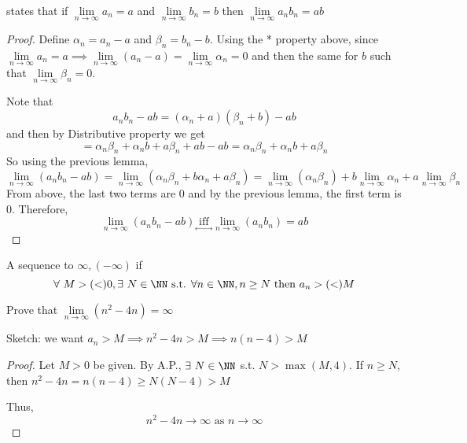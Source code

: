 \documentclass[12pt]{scrartcl}
\begin{document}
\begin{theorem}
   states that if $\underset{n\to\infty}{\lim}a_n = a$ and $\underset{n\to\infty}{\lim}b_n = b$ then 
  $\underset{n\to\infty}{\lim}a_n b_n = ab$
  \begin{proof}
    Define $\alpha_n = a_n - a$ and $\beta_n = b_n - b$. Using the * property above, 
    since $\underset{n\to\infty}{\lim}a_n = a \implies \underset{n\to\infty}{\lim} (a_n - a) = \underset{n\to\infty}{\lim}\alpha_n = 0$
    and then the same for $b$ such that $\underset{n\to\infty}{\lim}\beta_n = 0$.
    
    Note that 
    \[a_nb_n - ab = (\alpha_n + a)(\beta_n + b) - ab\] and then by Distributive property we get
    \[= \alpha_n\beta_n + \alpha_n b + a\beta_n + ab - ab = \alpha_n\beta_n + \alpha_n b + a\beta_n\]
    So using the previous lemma, 
    \[\lim_{n\to\infty}(a_n b_n - ab) = \lim_{n\to\infty}(\alpha_n \beta_n + b\alpha_n + a\beta_n) = \lim_{n\to\infty}(\alpha_n\beta_n) + b\lim_{n\to\infty}\alpha_n + a\lim_{n\to\infty}\beta_n\]
    From above, the last two terms are 0 and by the previous lemma, the first term is 0. 
    Therefore, 
    \[\lim_{n\to\infty}(a_nb_n - ab) \underset{\leftrightarrow}{\text{ iff }} \lim_{n\to\infty}(a_n b_n) = ab\]
  \end{proof}
\end{theorem}

\begin{definition}
  A sequence  to $\infty, (-\infty)$ if 
  \[\forall \ M > (<) 0, \exists \ N \in \NN \text{ s.t. } \forall n \in \NN, n \geq N \text{ then } a_n > (<) M\]
\end{definition}

\begin{example}
  Prove that $\underset{n\to\infty}{\lim}(n^2 - 4n) = \infty$

  Sketch: we want $a_n > M \implies n^2 - 4n > M \implies n(n-4) > M$
  
\begin{proof}

  Let $M > 0$ be given. By A.P., $\exists \ N \in \NN$ s.t. $N > \max(M, 4)$.
  If $n \geq N$, then $n^2 - 4n = n(n-4) \geq N(N - 4) > M$

  Thus, 
  \[n^2 - 4n \to \infty \text{ as } n \to \infty\]
\end{proof}

\end{example}
\end{document}
